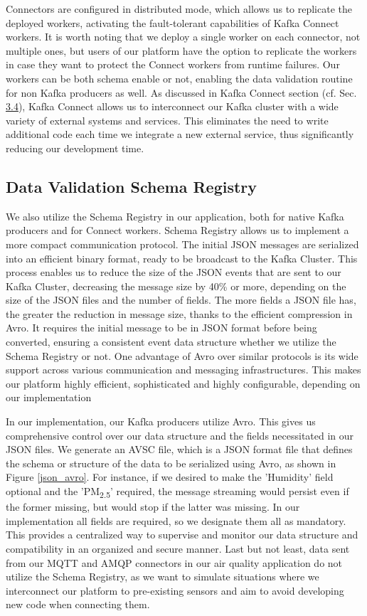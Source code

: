 Connectors are configured in distributed mode, which allows us to replicate the deployed workers, activating the fault-tolerant capabilities of Kafka Connect workers. It is worth noting that we deploy a single worker on each connector, not multiple ones, but users of our platform have the option to replicate the workers in case they want to protect the Connect workers from runtime failures. Our workers can be both schema enable or not, enabling the data validation routine for non Kafka producers as well.
As discussed in Kafka Connect section (cf. Sec. \hyperref[kafka_connect]{3.4}), Kafka Connect allows us to interconnect our Kafka cluster with a wide variety of external systems and services. This eliminates the need to write additional code each time we integrate a new external service, thus significantly reducing our development time.

\subsection{Data Validation Schema Registry}
We also utilize the Schema Registry in our application, both for native Kafka producers and for Connect workers. Schema Registry allows us to implement a more compact communication protocol. The initial JSON messages are serialized into an efficient binary format, ready to be broadcast to the Kafka Cluster. This process enables us to reduce the size of the JSON events that are sent to our Kafka Cluster, decreasing the message size by 40\% or more, depending on the size of the JSON files and the number of fields. The more fields a JSON file has, the greater the reduction in message size, thanks to the efficient compression in Avro. It requires the initial message to be in JSON format before being converted, ensuring a consistent event data structure whether we utilize the Schema Registry or not. One advantage of Avro over similar protocols is its wide support across various communication and messaging infrastructures. This makes our platform highly efficient, sophisticated and highly configurable, depending on our implementation

In our implementation, our Kafka producers utilize Avro. This gives us comprehensive control over our data structure and the fields necessitated in our JSON files. We generate an AVSC file, which is a JSON format file that defines the schema or structure of the data to be serialized using Avro, as shown in Figure \ref{json_avro}. For instance, if we desired to make the 'Humidity' field optional and the 'PM\textsubscript{2.5}' required, the message streaming would persist even if the former missing, but would stop if the latter was missing. In our implementation all fields are required, so we designate them all as mandatory. This provides a centralized way to supervise and monitor our data structure and compatibility in an organized and secure manner. Last but not least, data sent from our MQTT and AMQP connectors in our air quality application do not utilize the Schema Registry, as we want to simulate situations where we interconnect our platform to pre-existing sensors and aim to avoid developing new code when connecting them.

